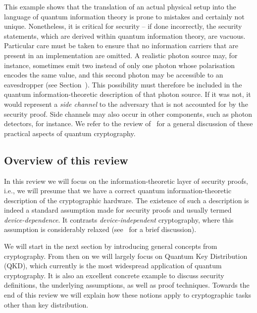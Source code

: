 This example shows that the translation of an actual physical setup into the language of quantum information theory is prone to mistakes and certainly not unique. Nonetheless, it is critical for security \--- if done incorrectly, the security statements, which are derived within quantum information theory, are vacuous. Particular care must be taken to ensure that no information carriers that are present in an implementation are omitted.  A realistic photon source may, for instance, sometimes emit two instead of only one photon whose polarisation encodes the same value, and this second photon may be accessible to an eavesdropper  (see Section~). This possibility must therefore be included in the quantum information-theoretic description of that photon source.  If it was not, it would represent a \emph{side channel} to the adversary that is not accounted for by the security proof. Side channels may also occur in other components, such as photon detectors, for instance. We refer to the review of~\cite{SBCDLP09} for a general discussion of these practical aspects of quantum cryptography. 


\subsection{Overview of this review}

In this review we will focus on the information-theoretic layer of security proofs, i.e., we will presume that we have a correct quantum information-theoretic description of the cryptographic hardware. The existence of such a description is indeed a standard assumption made for security proofs and usually termed \emph{device-dependence}. It contrasts \emph{device-independent} cryptography, where this assumption is considerably relaxed (see~ for a brief discussion). 

We will start in the next section by introducing general concepts from cryptography. From then on we will largely focus on Quantum Key Distribution (QKD), which currently is the most widespread application of  quantum cryptography. It is also an excellent concrete example to discuss security definitions, the underlying assumptions, as well as proof techniques. Towards the end of this review we will explain how these notions apply to cryptographic tasks other than key distribution.





